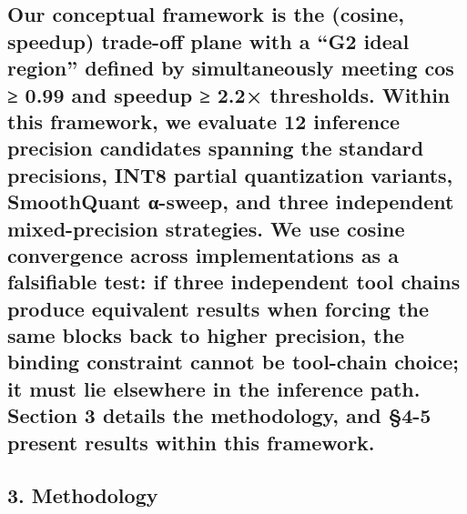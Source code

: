 \documentclass[
]{article}
\begin{document}
\subsection{\texorpdfstring{Our \textbf{conceptual framework} is the
(cosine, speedup) trade-off plane with a ``G2 ideal region'' defined by
simultaneously meeting cos ≥ 0.99 and speedup ≥ 2.2× thresholds. Within
this framework, we evaluate 12 inference precision candidates spanning
the standard precisions, INT8 partial quantization variants, SmoothQuant
α-sweep, and three independent mixed-precision strategies. We use cosine
convergence across implementations as a falsifiable test: if three
independent tool chains produce equivalent results when forcing the same
blocks back to higher precision, the binding constraint cannot be
tool-chain choice; it must lie elsewhere in the inference path. Section
3 details the methodology, and §4-5 present results within this
framework.}{Our conceptual framework is the (cosine, speedup) trade-off plane with a ``G2 ideal region'' defined by simultaneously meeting cos ≥ 0.99 and speedup ≥ 2.2× thresholds. Within this framework, we evaluate 12 inference precision candidates spanning the standard precisions, INT8 partial quantization variants, SmoothQuant α-sweep, and three independent mixed-precision strategies. We use cosine convergence across implementations as a falsifiable test: if three independent tool chains produce equivalent results when forcing the same blocks back to higher precision, the binding constraint cannot be tool-chain choice; it must lie elsewhere in the inference path. Section 3 details the methodology, and §4-5 present results within this framework.}}\label{our-conceptual-framework-is-the-cosine-speedup-trade-off-plane-with-a-g2-ideal-region-defined-by-simultaneously-meeting-cos-0.99-and-speedup-2.2-thresholds.-within-this-framework-we-evaluate-12-inference-precision-candidates-spanning-the-standard-precisions-int8-partial-quantization-variants-smoothquant-ux3b1-sweep-and-three-independent-mixed-precision-strategies.-we-use-cosine-convergence-across-implementations-as-a-falsifiable-test-if-three-independent-tool-chains-produce-equivalent-results-when-forcing-the-same-blocks-back-to-higher-precision-the-binding-constraint-cannot-be-tool-chain-choice-it-must-lie-elsewhere-in-the-inference-path.-section-3-details-the-methodology-and-4-5-present-results-within-this-framework.}

\subsection{3. Methodology}\label{methodology}
\end{document}

